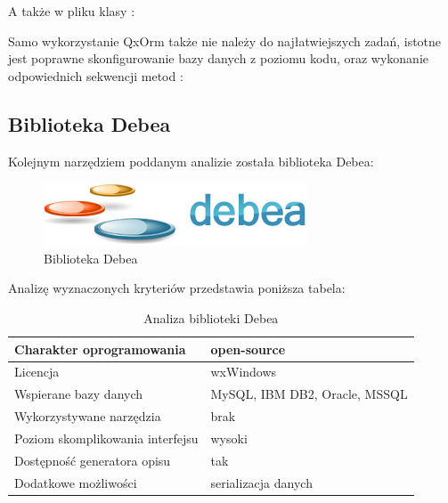 \documentclass[12pt]{report}
\begin{document}


A także w pliku klasy \cite{qxorm}:



Samo wykorzystanie QxOrm także nie należy do najłatwiejszych zadań, istotne jest poprawne skonfigurowanie bazy danych z poziomu kodu, oraz wykonanie odpowiednich
sekwencji metod \cite{qxorm}:



\subsection{Biblioteka Debea}

Kolejnym narzędziem poddanym analizie została biblioteka Debea:

\begin{figure}[h]
\centering
\includegraphics[width=.5\textwidth]{resources/debea.jpg}
\caption[Biblioteka Debea]{Biblioteka Debea \cite{debea}}
\end{figure}

Analizę wyznaczonych kryteriów przedstawia poniższa tabela:

\begin{table}[h]
\centering
\begin{tabular}{| l | l |} 
\hline 
Charakter oprogramowania & open-source \\ \hline
Licencja & wxWindows  \\ \hline
Wspierane bazy danych & MySQL, IBM DB2, Oracle, MSSQL\\ \hline
Wykorzystywane narzędzia & brak  \\ \hline
Poziom skomplikowania interfejsu & wysoki  \\ \hline
Dostępność generatora opisu & tak  \\ \hline
Dodatkowe możliwości &  serializacja danych  \\ \hline
\end{tabular} 
\caption{Analiza biblioteki Debea}
\end{table}
\end{document}
